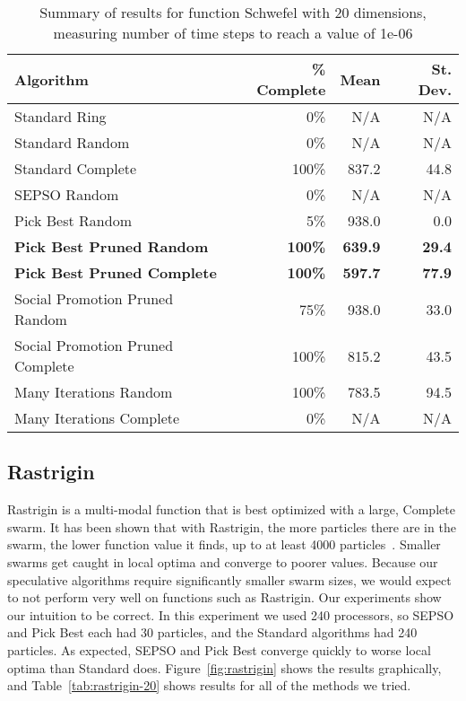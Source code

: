 \documentclass[ms,electronic,twosidetoc,letterpaper,chaptercenter,parttop,equalmargins]{byumsphd}
\newcommand{\fig}[1]{Figure~\ref{fig:#1}}
\newcommand{\tabref}[1]{Table~\ref{tab:#1}}
\begin{document}
\begin{table}
  \caption{Summary of results for function Schwefel with 20 dimensions,
  measuring number of time steps to reach a value of 1e-06}
  \label{tab:schwefel-20}
  \centering
  \begin{tabular}{|l|r|r|r|}
  \hline
  Algorithm&\% Complete&Mean&St. Dev.\\
  \hline
  \hline
  Standard Ring&0\%&N/A&N/A\\
  \hline
  Standard Random&0\%&N/A&N/A\\
  \hline
  Standard Complete&100\%&837.2&44.8\\
  \hline
  SEPSO Random&0\%&N/A&N/A\\
  \hline
  Pick Best Random&5\%&938.0&0.0\\
  \hline
  \textbf{Pick Best Pruned Random}&\textbf{100\%}&\textbf{639.9}&\textbf{29.4}\\
  \hline
  \textbf{Pick Best Pruned Complete}&\textbf{100\%}&\textbf{597.7}&
	\textbf{77.9}\\
  \hline
  Social Promotion Pruned Random&75\%&938.0&33.0\\
  \hline
  Social Promotion Pruned Complete&100\%&815.2&43.5\\
  \hline
  Many Iterations Random&100\%&783.5&94.5\\
  \hline
  Many Iterations Complete&0\%&N/A&N/A\\
  \hline
  \end{tabular}
\end{table}


\subsection{Rastrigin}

Rastrigin is a multi-modal function that is best optimized with a large,
Complete swarm.  It has been shown that with Rastrigin, the more particles
there are in the swarm, the lower function value it finds, up to at least 4000
particles~\citep{mcnabb-2009-large-particle-swarms}.  Smaller swarms get caught
in local optima and converge to poorer values.  Because our speculative
algorithms require significantly smaller swarm sizes, we would expect to not
perform very well on functions such as Rastrigin.  Our experiments show our
intuition to be correct.  In this experiment we used 240 processors, so SEPSO
and Pick Best each had 30 particles, and the Standard algorithms had 240
particles.  As expected, SEPSO and Pick Best converge quickly to worse local
optima than Standard does.  \fig{rastrigin} shows the results graphically, and
\tabref{rastrigin-20} shows results for all of the methods we tried.
\end{document}
